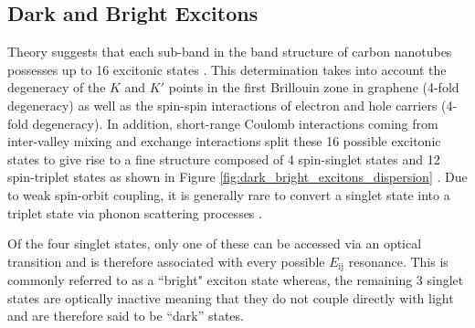 \subsection{Dark and Bright Excitons}

Theory suggests that each sub-band in the band structure of carbon nanotubes possesses up to 16 excitonic states \cite{amori2018excitons}. This determination takes into account the degeneracy of the $K$ and $K'$ points in the first Brillouin zone in graphene (4-fold degeneracy) as well as the spin-spin interactions of electron and hole carriers (4-fold degeneracy). In addition, short-range Coulomb interactions coming from inter-valley mixing and exchange interactions split these 16 possible excitonic states to give rise to a fine structure composed of 4 spin-singlet states and 12 spin-triplet states as shown in Figure \ref{fig:dark_bright_excitons_dispersion} \cite{ando2006effects}. Due to weak spin-orbit coupling, it is generally rare to convert a singlet state into a triplet state via phonon scattering processes \cite{amori2018excitons}.

Of the four singlet states, only one of these can be accessed via an optical transition and is therefore associated with every possible $E_\text{ij}$ resonance. This is commonly referred to as a ``bright" exciton state whereas, the remaining 3 singlet states are optically inactive meaning that they do not couple directly with light and are therefore said to be ``dark'' states.

